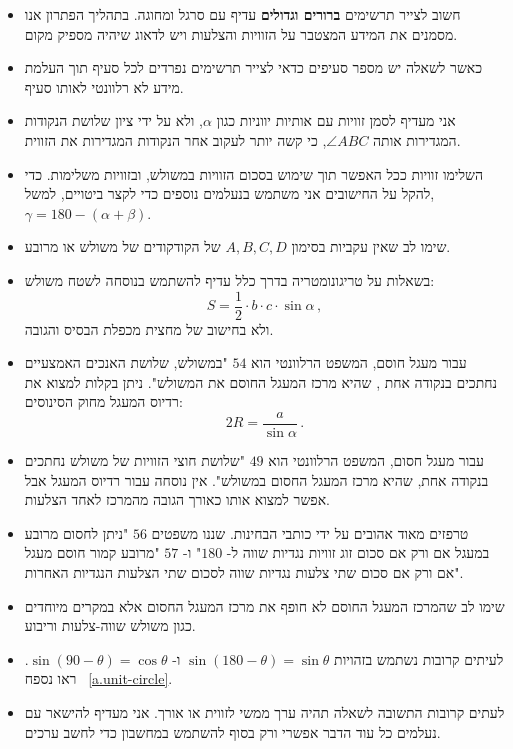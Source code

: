 \begin{itemize}

\item
חשוב לצייר תרשימים 
\textbf{ברורים וגדולים}
עדיף עם סרגל ומחוגה. בתהליך הפתרון אנו מסמנים את המידע המצטבר על הזוויות והצלעות ויש לדאוג שיהיה מספיק מקום.

\item
כאשר לשאלה יש מספר סעיפים כדאי לצייר תרשימים נפרדים לכל סעיף תוך העלמת מידע לא רלוונטי לאותו סעיף.

\item
אני מעדיף לסמן זוויות עם אותיות יווניות כגון
$\alpha$,
ולא על ידי ציון שלושת הנקודות המגדירות אותה
$\angle ABC$,
כי קשה יותר לעקוב אחר הנקודות המגדירות את הזווית.

\item
השלימו זוויות ככל האפשר תוך שימוש בסכום הזוויות במשולש, ובזוויות משלימות. כדי להקל על החישובים אני משתמש בנעלמים נוספים כדי לקצר ביטויים, למשל,
$\gamma=180-(\alpha+\beta)$.

\item
שימו לב שאין עקביות בסימון 
$A,B,C,D$
של הקודקודים של משולש או מרובע.


\item 
בשאלות על טריגונומטריה בדרך כלל עדיף להשתמש בנוסחה לשטח משולש:
\[
S=\frac{1}{2}\cdot b \cdot c \cdot\sin \alpha\,,
\]
ולא בחישוב של מחצית מכפלת הבסיס והגובה.

\item
עבור מעגל חוסם, המשפט הרלוונטי הוא
$54$
"במשולש, שלושת האנכים האמצעיים נחתכים בנקודה אחת , שהיא מרכז המעגל החוסם את המשולש". ניתן בקלות למצוא את רדיוס המעגל מחוק הסינוסים:
\[
2R=\frac{a}{\sin\alpha}\,.
\]
\vspace{-4ex}
\item
עבור מעגל חסום, המשפט הרלוונטי הוא
$49$
"שלושת חוצי הזוויות של משולש נחתכים בנקודה אחת, שהיא מרכז המעגל החסום במשולש". אין נוסחה עבור רדיוס המעגל אבל אפשר למצוא אותו כאורך הגובה מהמרכז לאחד הצלעות.


\item 
טרפזים מאוד אהובים על ידי כותבי הבחינות. שננו משפטים
$56$
"ניתן לחסום מרובע במעגל אם ורק אם סכום זוג זוויות נגדיות שווה ל-%
$180$"
ו-%
$57$
"מרובע קמור חוסם מעגל אם ורק אם סכום שתי צלעות נגדיות שווה לסכום שתי הצלעות הנגדיות האחרות".

\item
שימו לב שהמרכז המעגל החוסם לא חופף את מרכז המעגל החסום אלא במקרים מיוחדים כגון משולש שווה-צלעות וריבוע.

\item
לעיתים קרובות נשתמש בזהויות
$\sin (180-\theta) = \sin \theta$
ו-%
$\sin (90-\theta) = \cos \theta$.
ראו נספח~%
\ref{a.unit-circle}.

\item
לעתים קרובות התשובה לשאלה תהיה ערך ממשי לזווית או אורך. אני מעדיף להישאר עם נעלמים כל עוד הדבר אפשרי ורק בסוף להשתמש במחשבון כדי לחשב ערכים.


\end{itemize}


